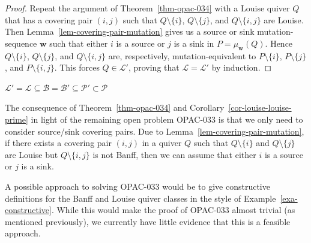 \documentclass[ALCO,Unicode]{cedram}
\newcommand{\BB}{\mathcal{B}}
\newcommand{\PP}{\mathcal{P}}
\newcommand{\LL}{\mathcal{L}}
\newcommand{\bw}{{\boldsymbol{w}}}
\begin{document}
\begin{proof}
    Repeat the argument of Theorem~\ref{thm-opac-034} with a Louise quiver $Q$ that has a covering pair $(i,j)$ such that $Q \setminus \{i\}$, $Q \setminus \{j\}$, and $Q \setminus \{i,j\}$ are Louise.
    Then Lemma~\ref{lem-covering-pair-mutation} gives us a source or sink mutation-sequence $\bw$ such that either $i$ is a source or $j$ is a sink in $P = \mu_\bw(Q)$.
    Hence $Q \setminus \{i\}$, $Q \setminus \{j\}$, and $Q \setminus \{i,j\}$ are, respectively, mutation-equivalent to $P \setminus \{i\}$, $P \setminus \{j\}$, and $P \setminus \{i,j\}$.
    This forces $Q \in \LL'$, proving that $\LL = \LL'$ by induction.
\end{proof}

\begin{coro} \label{cor-subclasses-all}
    $\LL' = \LL \subseteq \BB = \BB' \subseteq \PP' \subset \PP$
\end{coro}

The consequence of Theorem~\ref{thm-opac-034} and Corollary~\ref{cor-louise-louise-prime} in light of the remaining open problem OPAC-033 is that we only need to consider source/sink covering pairs. 
Due to Lemma~\ref{lem-covering-pair-mutation}, if there exists a covering pair $(i,j)$ in a quiver $Q$ such that $Q \setminus \{i\}$ and $Q \setminus \{j\}$ are Louise but $Q \setminus \{i,j\}$ is not Banff, then we can assume that either $i$ is a source or $j$ is a sink.

A possible approach to solving OPAC-033 would be to give constructive definitions for the Banff and Louise quiver classes in the style of Example~\ref{exa-constructive}. 
While this would make the proof of OPAC-033 almost trivial (as mentioned previously), we currently have little evidence that this is a feasible approach.
\end{document}
